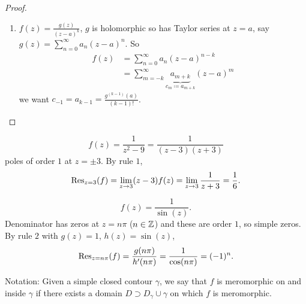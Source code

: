 \documentclass[10pt, a4paper]{article}
\begin{document}
\begin{proposition}
\begin{proof}
\begin{enumerate}[label = Rule \arabic*]
            \item $f(z) = \frac{g(z)}{(z - a) ^ k}$,
            $g$ is holomorphic so has Taylor series at $z = a$,
            say $g(z) = \sum_{n = 0}^{\infty}a_n(z - a) ^ n$.
            So
            \begin{align*}
                f(z) &= \sum_{n = 0}^{\infty}a_n(z - a) ^ {n - k} \\
                &= \sum_{m = -k}^{\infty}\underbrace{a_{m + k}}_{c_m \coloneqq a_{m + k}}(z - a) ^ m
            \end{align*}
            we want $c_{-1} = a_{k - 1} = \frac{g ^ {(k - 1)}(a)}{(k - 1)!}$.
        \end{enumerate}
    \end{proof}
\end{proposition}

\begin{example}
    \[
    f(z) = \frac{1}{z ^ 2 - 9} = \frac{1}{(z - 3)(z + 3)}
    \]
    poles of order $1$ at $z = \pm 3$.
    By rule $1$,
    \[
    \operatorname{Res}_{z = 3}(f) = \lim_{z \to 3}(z - 3)f(z) = \lim_{z \to 3}\frac{1}{z + 3} = \frac{1}{6}.
    \]

    \[
    f(z) = \frac{1}{\sin(z)}.
    \]
    Denominator has zeros at $z = n\pi$
    ($n \in \mathbb{Z}$)
    and these are order $1$,
    so simple zeros.
    By rule $2$ with $g(z) = 1$,
    $h(z) = \sin(z)$,
    \[
    \operatorname{Res}_{z = n\pi}(f) = \frac{g(n\pi)}{h'(n\pi)} = \frac{1}{\cos(n\pi)} = (-1) ^ n.
    \]
\end{example}

Notation:
Given a simple closed contour $\gamma$,
we say that $f$ is meromorphic on and inside $\gamma$ if there exists a domain $D \supset D_{\gamma} \cup \gamma$ on which $f$ is meromorphic.
\end{document}
